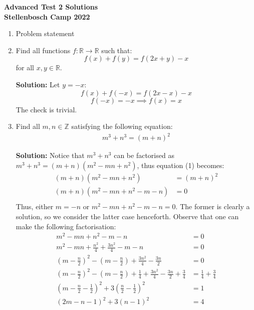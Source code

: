 \documentclass{article}
\begin{document}
\thispagestyle{empty}

\begin{center}
  \textbf{Advanced Test 2 Solutions}
  \\ \vspace{1em}
  \textbf{\large Stellenbosch Camp 2022}
\end{center}


\begin{enumerate}[itemsep=\fill]

\item %
Problem statement


\item %
Find all functions $f:\mathbb{R}\to\mathbb{R}$ such that:
\[f(x) + f(y) = f(2x+y) - x\] for all $x,y\in\mathbb{R}$.

\textbf{Solution:} Let $y = -x$:
\[f(x) + f(-x) = f(2x-x) - x\]
\[f(-x) = -x\implies f(x) = x\]
The check is trivial.

\item 
Find all $m,n\in \mathbb{Z}$ satisfying the following equation:
\begin{align}
m^3 + n^3 = (m+n)^2 
\end{align}

\textbf{Solution:} Notice that $m^3 + n^3$ can be factorised as $m^3 + n^3=(m+n)(m^{2} -mn + n^{2})$, thus equation (1) becomes:
\begin{align*}
    (m+n)(m^{2} -mn + n^{2}) & = (m+n)^2\\
    (m+n)(m^{2} -mn + n^{2} -m -n) & = 0 \\
\end{align*}
Thus, either $m = -n$ or $m^{2} -mn + n^{2} -m -n = 0$. The former is clearly a solution, so we consider the latter case henceforth. Observe that one can make the following factorisation:
\begin{align}
    m^{2} -mn + n^{2} -m -n & = 0 \nonumber\\ 
    m^{2} - mn + \frac{n^{2}}{4} + \frac{3n^{2}}{4} - m -n & = 0 \nonumber\\
    \left(m - \frac{n}{2}\right)^{2} - \left(m - \frac{n}{2}\right) + \frac{3n^{2}}{4} - \frac{3n}{2} & = 0 \nonumber\\
    \left(m - \frac{n}{2}\right)^{2} - \left(m - \frac{n}{2}\right) + \frac{1}{4} + \frac{3n^{2}}{4} - \frac{3n}{2} + \frac{3}{4} & = \frac{1}{4} +\frac{3}{4} \nonumber\\
    \left(m - \frac{n}{2} - \frac{1}{2}\right)^{2} +3\left(\frac{n}{2} - \frac{1}{2}\right)^{2} & = 1 \nonumber\\
    (2m - n - 1)^{2} + 3(n-1)^{2} & = 4 
\end{align}


\end{enumerate}
\end{document}
